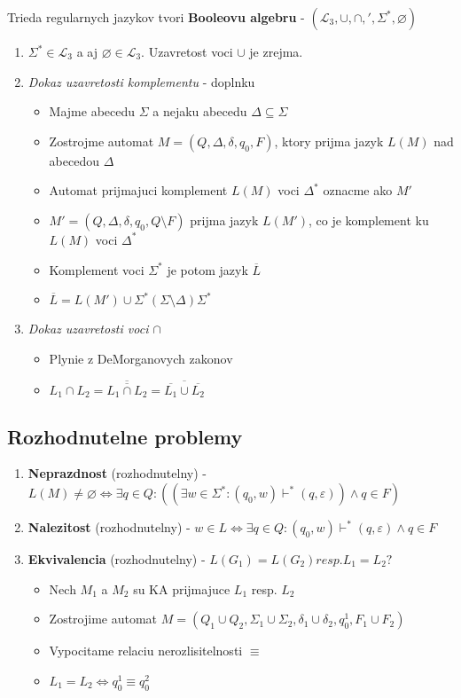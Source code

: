 \documentclass[12pt]{article}
\begin{document}
Trieda regularnych jazykov tvori \textbf{Booleovu algebru} - $(\mathcal{L}_{3}, \cup, \cap, ', \Sigma^{*}, \varnothing)$
\begin{enumerate}
	\item $\Sigma^{*} \in \mathcal{L}_{3}$ a aj $\varnothing \in \mathcal{L}_{3}$. Uzavretost voci $\cup$ je zrejma.
	\item \emph{Dokaz uzavretosti komplementu} - doplnku
	\begin{itemize}
		\item Majme abecedu $\Sigma$ a nejaku abecedu $\Delta \subseteq \Sigma$
		\item Zostrojme automat $M = (Q,\Delta,\delta,q_{0},F)$, ktory prijma jazyk $L(M)$ nad abecedou $\Delta$
		\item Automat prijmajuci komplement $L(M)$ voci $\Delta^{*}$ oznacme ako $M'$
		\item $M' = (Q,\Delta,\delta,q_{0},Q \setminus F)$ prijma jazyk $L(M')$, co je komplement ku $L(M)$ voci $\Delta^{*}$
		\item Komplement voci $\Sigma^{*}$ je potom jazyk $\overline{L}$
		\item $\overline{L} = L(M') \cup \Sigma^{*}(\Sigma \setminus \Delta)\Sigma^{*}$
	\end{itemize}
	\item \emph{Dokaz uzavretosti voci $\cap$}
	\begin{itemize}
		\item Plynie z DeMorganovych zakonov
		\item $L_{1} \cap L_{2} = \overline{\overline{L_{1} \cap L_{2}}} = \overline{\overline{L_{1}} \cup \overline{L_{2}}}$
	\end{itemize}
\end{enumerate}

\subsection*{Rozhodnutelne problemy}
\begin{enumerate}
	\item \textbf{Neprazdnost} (rozhodnutelny) - $L(M) \not= \varnothing \Leftrightarrow \exists q \in Q : ((\exists w \in \Sigma^{*}: (q_{0}, w) \vdash^{*} (q, \varepsilon)) \land q \in F)$
	\item \textbf{Nalezitost} (rozhodnutelny) - $w \in L \Leftrightarrow \exists q \in Q: (q_{0}, w) \vdash^{*} (q, \varepsilon) \land q \in F$
	\item \textbf{Ekvivalencia} (rozhodnutelny) - $L(G_{1}) = L(G_{2}) resp. L_{1} = L_{2}?$
		\begin{itemize}
			\item Nech $M_{1}$ a $M_{2}$ su KA prijmajuce $L_{1}$ resp. $L_{2}$
			\item Zostrojime automat $M = (Q_{1} \cup Q_{2}, \Sigma_{1} \cup \Sigma_{2}, \delta_{1} \cup \delta_{2}, q_{0}^{1}, F_{1} \cup F_{2})$
			\item Vypocitame relaciu nerozlisitelnosti $\equiv$
			\item $L_{1} = L_{2} \Leftrightarrow q_{0}^{1} \equiv q_{0}^{2}$
		\end{itemize}
\end{enumerate}
\end{document}
